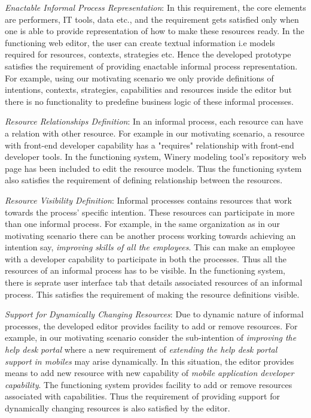 \textit{Enactable Informal Process Representation}: In this requirement, the core elements are performers, IT tools, data etc., and the requirement gets satisfied only when one is able to provide representation of how to make these resources ready. In the functioning web editor, the user can create textual information i.e models required for resources, contexts, strategies etc. Hence the developed prototype satisfies the requirement of providing enactable informal process representation. For example, using our motivating scenario we only provide definitions of intentions, contexts, strategies, capabilities and resources inside the editor but there is no functionality to  predefine business logic of these informal processes.

\textit{Resource Relationships Definition}: In an informal process, each resource can have a relation with other resource. For example in our motivating scenario, a resource with front-end developer capability has a "requires" relationship with front-end developer tools. In the functioning system, Winery modeling tool's repository web page has been included to edit the resource models. Thus the functioning system also satisfies the requirement of defining relationship between the resources. 

\textit{Resource Visibility Definition}: Informal processes contains resources that work towards the process' specific intention. These resources can participate in more than one informal process. For example, in the same organization as in our motivating scenario there can be another process working towards achieving an intention say, \textit{improving skills of all the employees}. This can make an employee with a developer capability to participate in both the processes. Thus all the resources of an informal process has to be visible. In the functioning system, there is seprate user interface tab that details associated resources of an informal process. This satisfies the requirement of making the resource definitions visible.    

\textit{Support for Dynamically Changing Resources}: Due to dynamic nature of informal processes, the developed editor provides facility to add or remove resources. For example, in our motivating scenario consider the sub-intention of \textit{improving the help desk portal} where a new requirement of \textit{extending the help desk portal support in mobiles} may arise dynamically. In this situation, the editor provides means to add new resource with new capability of \textit{mobile application developer capability}. The functioning system provides facility to add or remove resources associated with capabilities. Thus the requirement of providing support for dynamically changing resources is also satisfied by the editor. 
	


